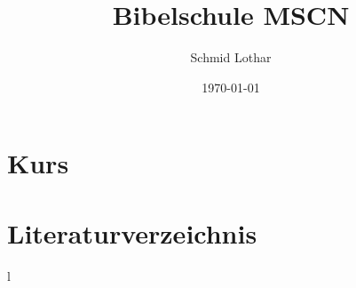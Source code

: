 \documentclass[a4paper, 11pt]{article}
\title{Bibelschule MSCN}
\author{Schmid Lothar}
\date{\today}
\begin{document}

\tableofcontents

\newpage

\section{Kurs}


\section{Literaturverzeichnis}
l
\end{document}
